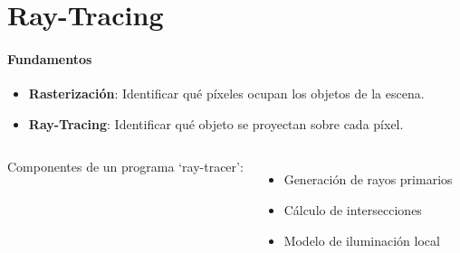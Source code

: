 \section{Ray-Tracing}
\begin{frame}{\insertsectionhead}
\framesubtitle{Fundamentos}
{\large 
\begin{itemize}
    \item \textbf{Rasterización}: Identificar qué píxeles ocupan los objetos de la escena.
    \item \textbf{Ray-Tracing}: Identificar qué objeto se proyectan sobre cada píxel.
\end{itemize}

\pause

\begin{columns}[c, onlytextwidth]
        
        Componentes de un programa `ray-tracer':
        
        \begin{itemize}
            \item Generación de rayos primarios
            \item Cálculo de intersecciones
            \item Modelo de iluminación local
        \end{itemize}
        
    \hfill
    \center
  \end{columns}
}

\end{frame}

